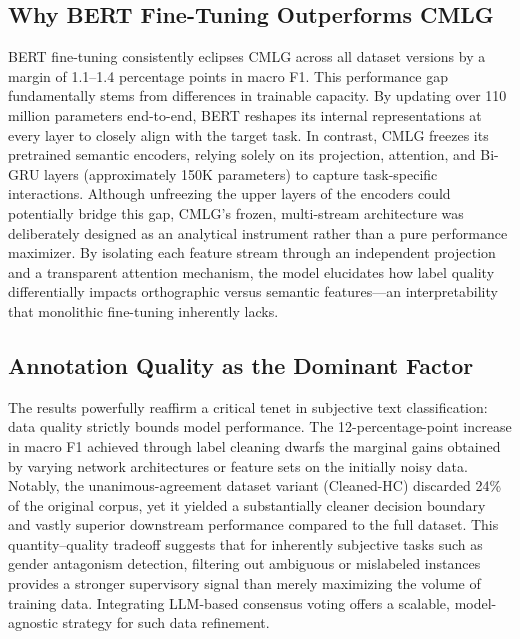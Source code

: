 ﻿\documentclass[12pt]{article}
\begin{document}
\subsection{Why BERT Fine-Tuning Outperforms CMLG}
BERT fine-tuning consistently eclipses CMLG across all dataset versions by a margin of 1.1--1.4 percentage points in macro F1. This performance gap fundamentally stems from differences in trainable capacity. By updating over 110 million parameters end-to-end, BERT reshapes its internal representations at every layer to closely align with the target task. In contrast, CMLG freezes its pretrained semantic encoders, relying solely on its projection, attention, and Bi-GRU layers (approximately 150K parameters) to capture task-specific interactions. Although unfreezing the upper layers of the encoders could potentially bridge this gap, CMLG's frozen, multi-stream architecture was deliberately designed as an analytical instrument rather than a pure performance maximizer. By isolating each feature stream through an independent projection and a transparent attention mechanism, the model elucidates how label quality differentially impacts orthographic versus semantic features---an interpretability that monolithic fine-tuning inherently lacks.

\subsection{Annotation Quality as the Dominant Factor}
The results powerfully reaffirm a critical tenet in subjective text classification: data quality strictly bounds model performance. The 12-percentage-point increase in macro F1 achieved through label cleaning dwarfs the marginal gains obtained by varying network architectures or feature sets on the initially noisy data. Notably, the unanimous-agreement dataset variant (Cleaned-HC) discarded 24\% of the original corpus, yet it yielded a substantially cleaner decision boundary and vastly superior downstream performance compared to the full dataset. This quantity--quality tradeoff suggests that for inherently subjective tasks such as gender antagonism detection, filtering out ambiguous or mislabeled instances provides a stronger supervisory signal than merely maximizing the volume of training data. Integrating LLM-based consensus voting offers a scalable, model-agnostic strategy for such data refinement.
\end{document}
